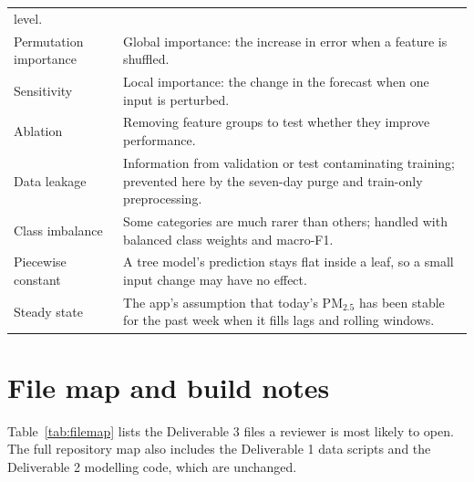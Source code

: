 \begin{longtable}{@{}L{3.6cm}L{11.0cm}@{}}
level. \\
Permutation importance & Global importance: the increase in error when a feature
is shuffled. \\
Sensitivity & Local importance: the change in the forecast when one input is
perturbed. \\
Ablation & Removing feature groups to test whether they improve performance. \\
Data leakage & Information from validation or test contaminating training;
prevented here by the seven-day purge and train-only preprocessing. \\
Class imbalance & Some categories are much rarer than others; handled with
balanced class weights and macro-F1. \\
Piecewise constant & A tree model's prediction stays flat inside a leaf, so a
small input change may have no effect. \\
Steady state & The app's assumption that today's PM$_{2.5}$ has been stable for
the past week when it fills lags and rolling windows. \\
\end{longtable}

\section{File map and build notes}
\label{app:files}

Table~\ref{tab:filemap} lists the Deliverable 3 files a reviewer is most likely
to open. The full repository map also includes the Deliverable 1 data scripts and
the Deliverable 2 modelling code, which are unchanged.

